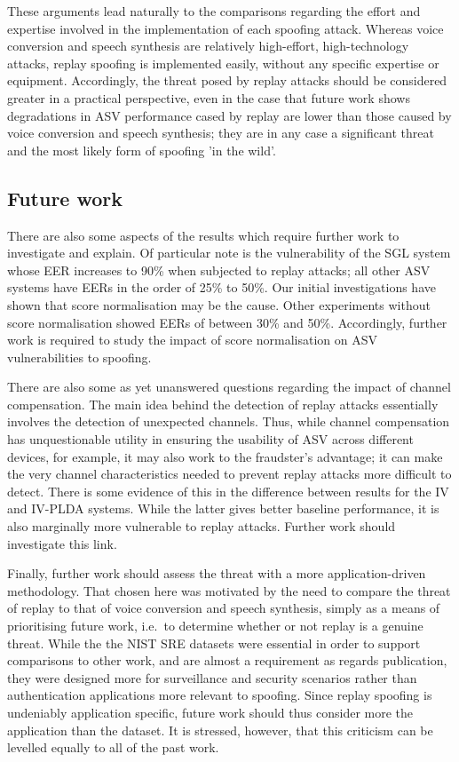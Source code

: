These arguments lead naturally to the comparisons regarding the effort and expertise involved in the implementation of each spoofing attack.  Whereas voice conversion and speech synthesis are relatively high-effort, high-technology attacks, replay spoofing is implemented easily, without any specific expertise or equipment.  Accordingly, the threat posed by replay attacks should be considered greater in a practical perspective, even in the case that future work shows degradations in ASV performance cased by replay are lower than those caused by voice conversion and speech synthesis; they are in any case a significant threat and the most likely form of spoofing 'in the wild'.



\subsection{Future work}

There are also some aspects of the results which require further work to investigate and explain.  Of particular note is the vulnerability of the SGL system whose EER increases to 90\% when subjected to replay attacks; all other ASV systems have EERs in the order of 25\% to 50\%.  Our initial investigations have shown that score normalisation may be the cause.  Other experiments without score normalisation showed EERs of between 30\% and 50\%.  Accordingly, further work is required to study the impact of score normalisation on ASV vulnerabilities to spoofing. 

There are also some as yet unanswered questions regarding the impact of channel compensation.  The main idea behind the detection of replay attacks essentially involves the detection of unexpected channels.  Thus, while channel compensation has unquestionable utility in ensuring the usability of ASV across different devices, for example, it may also work to the fraudster's advantage; it can make the very channel characteristics needed to prevent replay attacks more difficult to detect.  There is some evidence of this in the difference between results for the IV and IV-PLDA systems.  While the latter gives better baseline performance, it is also marginally more vulnerable to replay attacks.  Further work should investigate this link.

Finally, further work should assess the threat with a more application-driven methodology.  That chosen here was motivated by the need to compare the threat of replay to that of voice conversion and speech synthesis, simply as a means of prioritising future work, i.e.\ to determine whether or not replay is a genuine threat.  While the the NIST SRE datasets were essential in order to support comparisons to other work, and are almost a requirement as regards publication, they were designed more for surveillance and security scenarios rather than authentication applications more relevant to spoofing.  Since replay spoofing is undeniably application specific, future work should thus consider more the application than the dataset.  It is stressed, however, that this criticism can be levelled equally to all of the past work.
